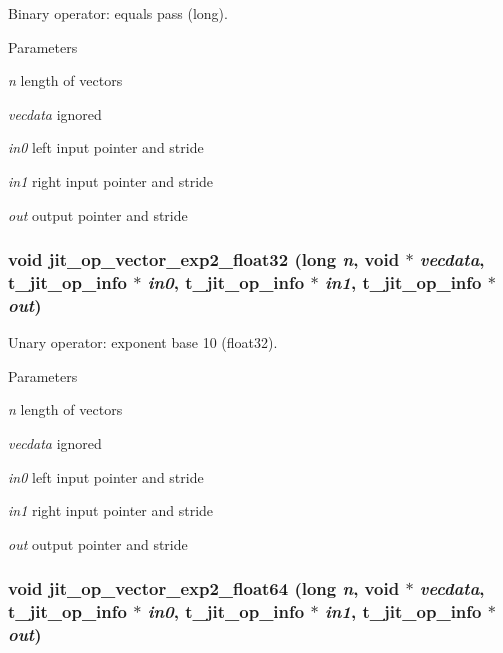 Binary operator: equals pass (long). 
\begin{DoxyParams}{Parameters}
\item[{\em n}]length of vectors \item[{\em vecdata}]ignored \item[{\em in0}]left input pointer and stride \item[{\em in1}]right input pointer and stride \item[{\em out}]output pointer and stride \end{DoxyParams}
\hypertarget{group__opvecmod_gab9dbf960d557a8a0762805ede759a295}{
\subsubsection[{jit\_\-op\_\-vector\_\-exp2\_\-float32}]{\setlength{\rightskip}{0pt plus 5cm}void jit\_\-op\_\-vector\_\-exp2\_\-float32 (long {\em n}, \/  void $\ast$ {\em vecdata}, \/  {\bf t\_\-jit\_\-op\_\-info} $\ast$ {\em in0}, \/  {\bf t\_\-jit\_\-op\_\-info} $\ast$ {\em in1}, \/  {\bf t\_\-jit\_\-op\_\-info} $\ast$ {\em out})}}
\label{group__opvecmod_gab9dbf960d557a8a0762805ede759a295}


Unary operator: exponent base 10 (float32). 
\begin{DoxyParams}{Parameters}
\item[{\em n}]length of vectors \item[{\em vecdata}]ignored \item[{\em in0}]left input pointer and stride \item[{\em in1}]right input pointer and stride \item[{\em out}]output pointer and stride \end{DoxyParams}
\hypertarget{group__opvecmod_gadd40619cdc366c6599bb6e145a8c59b6}{
\subsubsection[{jit\_\-op\_\-vector\_\-exp2\_\-float64}]{\setlength{\rightskip}{0pt plus 5cm}void jit\_\-op\_\-vector\_\-exp2\_\-float64 (long {\em n}, \/  void $\ast$ {\em vecdata}, \/  {\bf t\_\-jit\_\-op\_\-info} $\ast$ {\em in0}, \/  {\bf t\_\-jit\_\-op\_\-info} $\ast$ {\em in1}, \/  {\bf t\_\-jit\_\-op\_\-info} $\ast$ {\em out})}}
\label{group__opvecmod_gadd40619cdc366c6599bb6e145a8c59b6}


